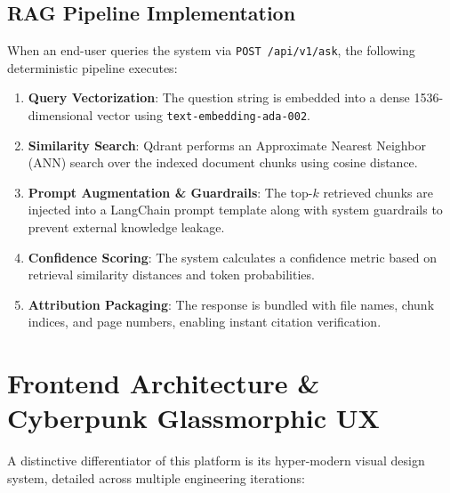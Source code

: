 \documentclass[11pt,a4paper]{article}
\begin{document}
\subsection{RAG Pipeline Implementation}
When an end-user queries the system via \texttt{POST /api/v1/ask}, the following deterministic pipeline executes:
\begin{enumerate}
    \item \textbf{Query Vectorization}: The question string is embedded into a dense 1536-dimensional vector using \texttt{text-embedding-ada-002}.
    \item \textbf{Similarity Search}: Qdrant performs an Approximate Nearest Neighbor (ANN) search over the indexed document chunks using cosine distance.
    \item \textbf{Prompt Augmentation \& Guardrails}: The top-$k$ retrieved chunks are injected into a LangChain prompt template along with system guardrails to prevent external knowledge leakage.
    \item \textbf{Confidence Scoring}: The system calculates a confidence metric based on retrieval similarity distances and token probabilities.
    \item \textbf{Attribution Packaging}: The response is bundled with file names, chunk indices, and page numbers, enabling instant citation verification.
\end{enumerate}

\section{Frontend Architecture \& Cyberpunk Glassmorphic UX}

A distinctive differentiator of this platform is its hyper-modern visual design system, detailed across multiple engineering iterations:
\end{document}
